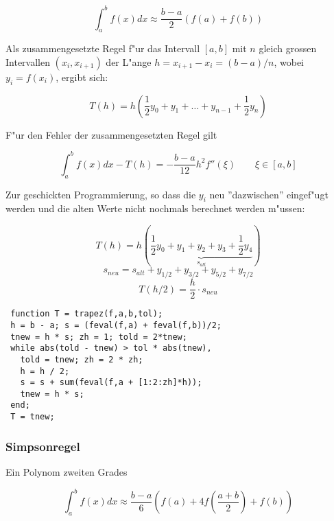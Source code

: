 \documentclass[german, 10pt, a4paper, twocolumn]{scrartcl}
\theoremstyle{definition}
\begin{document}
\begin{displaymath}
	\int^b_a f(x) dx \approx \frac{b-a}{2} ( f(a) + f(b) )
\end{displaymath}

Als zusammengesetzte Regel f"ur das Intervall $[a,b]$ mit $n$ gleich grossen Intervallen $(x_i, x_{i+1})$ der L"ange $h = x_{i+1} - x_{i} = (b-a)/n$, wobei $y_i = f(x_i)$, ergibt sich:

\begin{displaymath}
	 T(h) = h \left ( \frac{1}{2} y_0 + y_1 + \hdots + y_{n-1} + \frac{1}{2} y_n \right )
\end{displaymath}

F"ur den Fehler der zusammengesetzten Regel gilt

\begin{displaymath}
	 \int^b_a f(x) dx - T(h) = - \frac{b-a}{12} h^2 f''(\xi) \qquad \xi \in [a,b]
\end{displaymath}

Zur geschickten Programmierung, so dass die $y_i$ neu ''dazwischen'' eingef"ugt werden und die alten Werte nicht nochmals berechnet werden m"ussen:

\begin{displaymath}
	T(h) = h(\underbrace{\frac{1}{2}y_0 + y_1 + y_2 + y_3 + \frac{1}{2} y_4}_{s_{alt}})
\end{displaymath}
\begin{displaymath}
	s_{neu} = s_{alt} + y_{1/2} + y_{3/2}+ y_{5/2} + y_{7/2}
\end{displaymath}
\begin{displaymath}
	T(h/2) = \frac{h}{2} \cdotp s_{neu}
\end{displaymath}

\small
\begin{verbatim}
 function T = trapez(f,a,b,tol);
 h = b - a; s = (feval(f,a) + feval(f,b))/2;
 tnew = h * s; zh = 1; told = 2*tnew;
 while abs(told - tnew) > tol * abs(tnew),
   told = tnew; zh = 2 * zh;
   h = h / 2;
   s = s + sum(feval(f,a + [1:2:zh]*h));
   tnew = h * s;
 end;
 T = tnew;
\end{verbatim}
\normalsize

\subsubsection{Simpsonregel}

Ein Polynom zweiten Grades 

\begin{displaymath}
	\int^b_a f(x) dx \approx \frac{b-a}{6} \left ( f(a) + 4f \left ( \frac{a+b}{2} \right ) +f(b) \right)
\end{displaymath}
\end{document}
